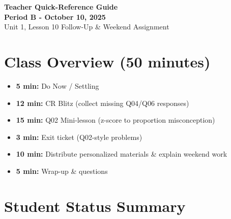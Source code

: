 \documentclass[11pt]{article}
\begin{document}
\begin{center}
{\LARGE \textbf{Teacher Quick-Reference Guide}}\\[0.05in]
{\Large \textbf{Period B - October 10, 2025}}\\[0.05in]
{\large Unit 1, Lesson 10 Follow-Up \& Weekend Assignment}
\end{center}

\vspace{0.15in}

\section*{Class Overview (50 minutes)}

\begin{tcolorbox}[colback=blue!5!white,colframe=blue!75!black,title=\textbf{Today's Schedule}]
\begin{itemize}[leftmargin=*]
    \item \textbf{5 min:} Do Now / Settling
    \item \textbf{12 min:} CR Blitz (collect missing Q04/Q06 responses)
    \item \textbf{15 min:} Q02 Mini-lesson (z-score to proportion misconception)
    \item \textbf{3 min:} Exit ticket (Q02-style problems)
    \item \textbf{10 min:} Distribute personalized materials \& explain weekend work
    \item \textbf{5 min:} Wrap-up \& questions
\end{itemize}
\end{tcolorbox}

\vspace{0.15in}

\section*{Student Status Summary}
\end{document}
